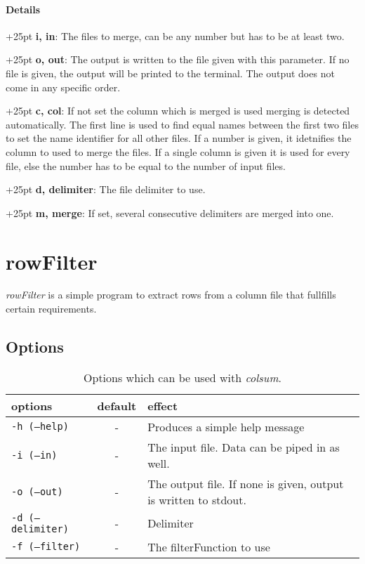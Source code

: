 \documentclass[a4paper,10pt,parskip=half]{scrreprt}
\begin{document}
\subsubsection{Details}

\hangindent+25pt 
\textbf{i, in}: The files to merge, can be any number but has to be at least
two.

\hangindent+25pt 
\textbf{o, out}: The output is written to the file given with this parameter. If
no file is given, the output will be printed to the terminal. The output does
not come in any specific order.

\hangindent+25pt 
\textbf{c, col}: If not set the column which is merged is used merging is
detected automatically. The first line is used to find equal names between the
first two files to set the name identifier for all other files. 
If a number is given, it idetnifies the column to used to merge the files. If a single column is given it is used for every file, else the number has to be equal to the number of input files.

\hangindent+25pt 
\textbf{d, delimiter}: The file delimiter to use. 

\hangindent+25pt 
\textbf{m, merge}: If set, several consecutive delimiters are merged into one.



\chapter{rowFilter}


\textit{rowFilter} is a simple program to extract rows from a column file that fullfills certain requirements.

\section{Options}
\begin{table}[h]
\caption{Options which can be used with \textit{colsum}.}
\begin{tabular}{lcp{7cm}}\hline
options& default & effect \\\hline
 \texttt{-h (--help)}&- & Produces a simple help message\\
 \texttt{-i (--in)} &-& The input file. Data can be piped in as well.\\
 \texttt{-o (--out)} &-& The output file. If none is given, output is written to stdout.\\
 \texttt{-d (--delimiter)} &-& Delimiter\\
 \texttt{-f (--filter)} &-& The filterFunction to use\\
\end{tabular}
\end{table}
\end{document}
